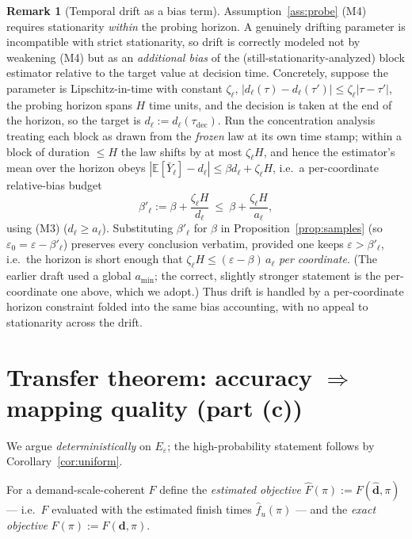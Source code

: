 \documentclass{amsart}
\theoremstyle{definition}
\newtheorem{remark}{Remark}
\newcommand{\E}{\mathbb{E}}
\begin{document}
\begin{remark}[Temporal drift as a bias term]\label{rem:drift}
Assumption~\ref{ass:probe} (M4) requires stationarity \emph{within} the probing
horizon. A genuinely drifting parameter is incompatible with strict
stationarity, so drift is correctly modeled not by weakening (M4) but as an
\emph{additional bias} of the (still-stationarity-analyzed) block estimator
relative to the target value at decision time. Concretely, suppose the
parameter is Lipschitz-in-time with constant $\zeta_\ell$,
$|d_\ell(\tau)-d_\ell(\tau')|\le\zeta_\ell|\tau-\tau'|$, the probing horizon
spans $H$ time units, and the decision is taken at the end of the horizon, so the
target is $d_\ell:=d_\ell(\tau_{\mathrm{dec}})$. Run the concentration analysis
treating each block as drawn from the \emph{frozen} law at its own time stamp;
within a block of duration $\le H$ the law shifts by at most $\zeta_\ell H$, and
hence the estimator's mean over the horizon obeys
$|\E[\bar Y_\ell]-d_\ell|\le\beta d_\ell+\zeta_\ell H$, i.e.\ a per-coordinate
relative-bias budget
\[
\beta'_\ell:=\beta+\frac{\zeta_\ell H}{d_\ell}\ \le\ \beta+\frac{\zeta_\ell H}{a_\ell},
\]
using (M3) ($d_\ell\ge a_\ell$). Substituting $\beta'_\ell$ for $\beta$ in
Proposition~\ref{prop:samples} (so $\varepsilon_0=\varepsilon-\beta'_\ell$)
preserves every conclusion verbatim, provided one keeps
$\varepsilon>\beta'_\ell$, i.e.\ the horizon is short enough that
$\zeta_\ell H\le(\varepsilon-\beta)\,a_\ell$ \emph{per coordinate}. (The earlier
draft used a global $a_{\min}$; the correct, slightly stronger statement is the
per-coordinate one above, which we adopt.) Thus drift is handled by a
per-coordinate horizon constraint folded into the same bias accounting, with no
appeal to stationarity across the drift.
\end{remark}

\section{Transfer theorem: accuracy $\Rightarrow$ mapping quality (part (c))}\label{sec:transfer}

We argue \emph{deterministically} on $E_\varepsilon$; the high-probability
statement follows by Corollary~\ref{cor:uniform}.

For a demand-scale-coherent $F$ define the \emph{estimated objective}
$\widehat F(\pi):=F(\widehat{\mathbf d},\pi)$ — i.e.\ $F$ evaluated with the
estimated finish times $\widehat f_u(\pi)$ — and the \emph{exact objective}
$F(\pi):=F(\mathbf d,\pi)$.
\end{document}
